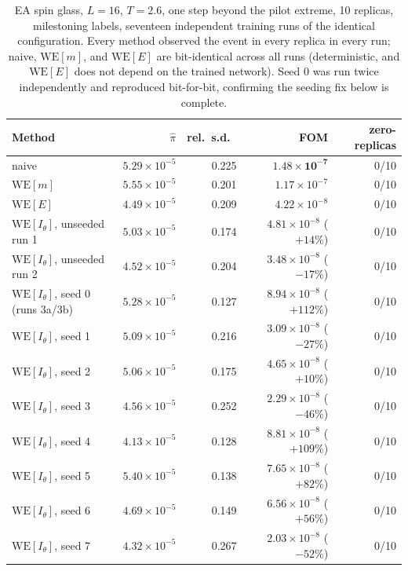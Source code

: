 \documentclass[a4paper,fleqn]{cas-sc}
\begin{document}
\begin{table}[H]
\centering\small
\caption{EA spin glass, $L=16$, $T=2.6$, one step beyond the pilot extreme, 10 replicas,
	milestoning labels, seventeen independent training runs of the identical configuration.
	Every method observed the event in every replica in every run; naive,
	$\mathrm{WE}[m]$, and $\mathrm{WE}[E]$ are bit-identical across all runs (deterministic,
	and $\mathrm{WE}[E]$ does not depend on the trained network). Seed 0 was run twice
	independently and reproduced bit-for-bit, confirming the seeding fix below is
	complete.}
\label{tab:milestone}
\begin{tabular}{lrrrr}
	\toprule
	Method & $\hat\pi$ & rel.\ s.d.\ & FOM & zero-replicas \\
	\midrule
	naive & $5.29\times10^{-5}$ & 0.225 & $\mathbf{1.48\times10^{-7}}$ & 0/10 \\
	$\mathrm{WE}[m]$ & $5.55\times10^{-5}$ & 0.201 & $1.17\times10^{-7}$ & 0/10 \\
	$\mathrm{WE}[E]$ & $4.49\times10^{-5}$ & 0.209 & $4.22\times10^{-8}$ & 0/10 \\
	$\mathrm{WE}[I_\theta]$, unseeded run 1 & $5.03\times10^{-5}$ & 0.174 &
	$4.81\times10^{-8}$ ($+14\%$) & 0/10 \\
	$\mathrm{WE}[I_\theta]$, unseeded run 2 & $4.52\times10^{-5}$ & 0.204 &
	$3.48\times10^{-8}$ ($-17\%$) & 0/10 \\
	$\mathrm{WE}[I_\theta]$, seed 0 (runs 3a/3b) & $5.28\times10^{-5}$ & 0.127 &
	$8.94\times10^{-8}$ ($+112\%$) & 0/10 \\
	$\mathrm{WE}[I_\theta]$, seed 1 & $5.09\times10^{-5}$ & 0.216 &
	$3.09\times10^{-8}$ ($-27\%$) & 0/10 \\
	$\mathrm{WE}[I_\theta]$, seed 2 & $5.06\times10^{-5}$ & 0.175 &
	$4.65\times10^{-8}$ ($+10\%$) & 0/10 \\
	$\mathrm{WE}[I_\theta]$, seed 3 & $4.56\times10^{-5}$ & 0.252 &
	$2.29\times10^{-8}$ ($-46\%$) & 0/10 \\
	$\mathrm{WE}[I_\theta]$, seed 4 & $4.13\times10^{-5}$ & 0.128 &
	$8.81\times10^{-8}$ ($+109\%$) & 0/10 \\
	$\mathrm{WE}[I_\theta]$, seed 5 & $5.40\times10^{-5}$ & 0.138 &
	$7.65\times10^{-8}$ ($+82\%$) & 0/10 \\
	$\mathrm{WE}[I_\theta]$, seed 6 & $4.69\times10^{-5}$ & 0.149 &
	$6.56\times10^{-8}$ ($+56\%$) & 0/10 \\
	$\mathrm{WE}[I_\theta]$, seed 7 & $4.32\times10^{-5}$ & 0.267 &
	$2.03\times10^{-8}$ ($-52\%$) & 0/10 \\

\end{tabular}
\end{table}
\end{document}
